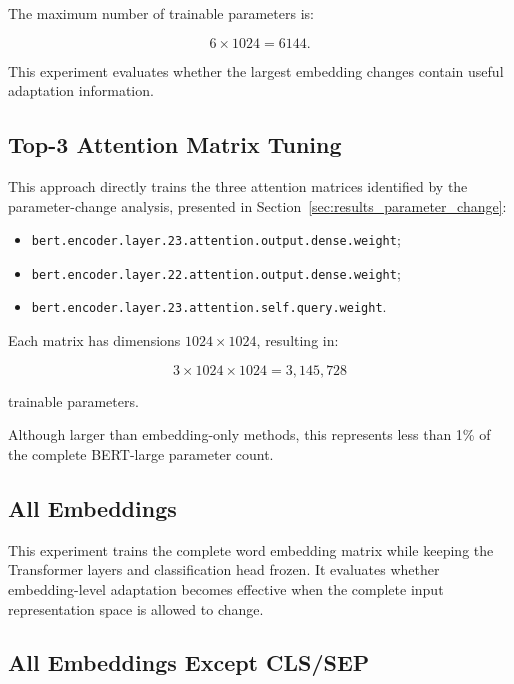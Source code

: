 The maximum number of trainable parameters is:

\begin{equation}
    6 \times 1024 = 6144.
\end{equation}

This experiment evaluates whether the largest embedding changes contain useful adaptation information.

\subsection{Top-3 Attention Matrix Tuning}
\label{subsec:methodology_top3_attention}

This approach directly trains the three attention matrices identified by the parameter-change analysis, presented in Section~\ref{sec:results_parameter_change}:

\begin{itemize}
    \item \texttt{bert.encoder.layer.23.attention.output.dense.weight};
    \item \texttt{bert.encoder.layer.22.attention.output.dense.weight};
    \item \texttt{bert.encoder.layer.23.attention.self.query.weight}.
\end{itemize}

Each matrix has dimensions $1024 \times 1024$, resulting in:

\begin{equation}
    3 \times 1024 \times 1024
    =
    3,145,728
\end{equation}

trainable parameters.

Although larger than embedding-only methods, this represents less than 1\% of the complete BERT-large parameter count.

\subsection{All Embeddings}
\label{subsec:methodology_all_embeddings}

This experiment trains the complete word embedding matrix while keeping the Transformer layers and classification head frozen. It evaluates whether embedding-level adaptation becomes effective when the complete input representation space is allowed to change.

\subsection{All Embeddings Except CLS/SEP}
\label{subsec:methodology_all_except_cls_sep}


